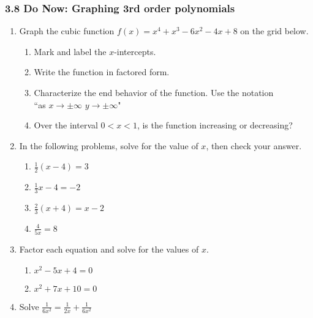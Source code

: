 \documentclass[12pt, twoside]{article}
\begin{document}
\subsubsection*{3.8 Do Now: Graphing 3rd order polynomials}
\begin{enumerate}
\item Graph the cubic function $f(x) = x^{4}+x^{3}-6x^{2}-4x+8$ on the grid below. 
  \begin{enumerate}
      \item Mark and label the $x$-intercepts. 
      \item Write the function in factored form. \vspace{1.5cm}
      \item Characterize the end behavior of the function. Use the notation \\
      ``as $x \rightarrow \pm \infty$ $y \rightarrow\pm \infty$"    
      \item Over the interval $0<x<1$, is the function increasing or decreasing? 
  \end{enumerate} \hspace{2cm}
  
    \begin{center}
    \end{center}

\newpage
\item In the following problems, solve for the value of $x$, then check your answer.
\begin{multicols}{2}
  \begin{enumerate}[itemsep=3cm]
    \item $\frac{1}{2}(x - 4) = 3$
    \item $\frac{1}{3} x - 4 = -2$
    \item $\frac{2}{3}(x + 4) = x - 2$
    \item $\displaystyle \frac{4}{5x} = 8$
  \end{enumerate}
  \end{multicols} \vspace{4cm}

\item Factor each equation and solve for the values of $x$.
  \begin{multicols}{2}
    \begin{enumerate}[itemsep=5cm]
    \item $x^2-5x+4=0$
    \item $x^2+7x+10=0$
  \end{enumerate}
  \end{multicols} \vspace{4cm}

\item Solve $\displaystyle \frac{1}{6x^2} = \frac{1}{2x} + \frac{1}{6x^2}$ 

\end{enumerate}
\end{document}

